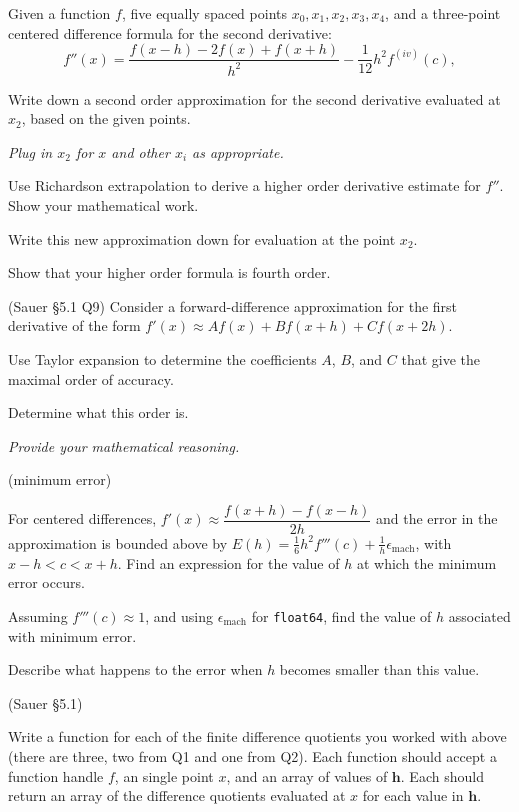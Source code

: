 \documentclass[12pt,letterpaper,noanswers]{exam}
\newcommand{\vc}[1]{\boldsymbol{#1}}
\begin{document}
\begin{questions}
\item Given a function $f$, five equally spaced points $x_0, x_1, x_2, x_3, x_4$, and a three-point centered difference formula for the second derivative:
\[f''(x) = \dfrac{f(x-h)-2f(x)+f(x+h)}{h^2}-\frac{1}{12}h^2f^{(iv)}(c),\]
\begin{parts}
\item Write down a second order approximation for the second derivative evaluated at $x_2$, based on the given points.

\emph{Plug in $x_2$ for $x$ and other $x_i$ as appropriate.}
\item Use Richardson extrapolation to derive a higher order derivative estimate for $f''$.  Show your mathematical work.

Write this new approximation down for evaluation at the point $x_2$.

\item Show that your higher order formula is fourth order.

\end{parts}
\question (Sauer \S 5.1 Q9) Consider a forward-difference approximation for the first derivative of the form $f'(x) \approx A f(x) + Bf(x+h) + Cf(x+2h)$.

Use Taylor expansion to determine the coefficients $A$, $B$, and $C$ that give the maximal order of accuracy.  

Determine what this order is.

\emph{Provide your mathematical reasoning.}



\question (minimum error)

For centered differences, $f'(x) \approx \dfrac{f(x+h)-f(x-h)}{2h}$ and the error in the approximation is bounded above by $E(h) = \frac{1}{6}h^2f'''(c) + \frac{1}{h}\epsilon_{\text{mach}}$, with $x-h < c < x+h$.  Find an expression for the value of $h$ at which the minimum error occurs.

Assuming $f'''(c)\approx 1$, and using $\epsilon_{\text{mach}}$ for \texttt{float64}, find the value of $h$ associated with minimum error.

Describe what happens to the error when $h$ becomes smaller than this value.


\question (Sauer \S 5.1)
\begin{parts}
\item Write a function for each of the finite difference quotients you worked with above (there are three, two from Q1 and one from Q2).  Each function should accept a function handle $f$, an single point $x$, and an array of values of $\vc{h}$.  Each should return an array of the difference quotients evaluated at $x$ for each value in $\vc{h}$.


\end{parts}
\end{questions}
\end{document}
